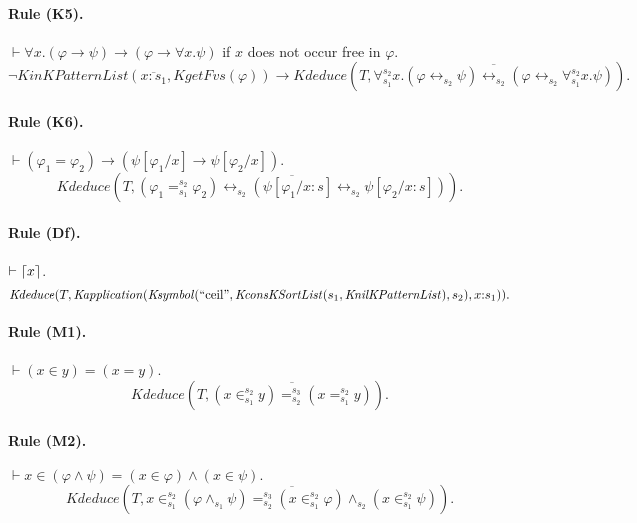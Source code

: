 \documentclass[UTF8,11pt]{article}
\theoremstyle{plain}
\theoremstyle{definition}
\theoremstyle{remark}
\newcommand{\cln}{{:}}
\DeclarePairedDelimiter{\ceil}{\lceil}{\rceil}
\newcommand{\Ksymbol}{\mathit{Ksymbol}}
\newcommand{\KnilKPatternList}{\mathit{KnilKPatternList}}
\newcommand{\KinKPatternList}{\mathit{KinKPatternList}}
\newcommand{\KconsKSortList}{\mathit{KconsKSortList}}
\newcommand{\Kapplication}{\mathit{Kapplication}}
\newcommand{\KgetFvs}{\mathit{KgetFvs}}
\newcommand{\Kdeduce}{\mathit{Kdeduce}}
\newcommand{\quot}[1]{\mathrm{``#1"}}
\begin{document}
\paragraph{Rule (K5).}
$\vdash \forall x . (\varphi \to \psi) \to (\varphi \to \forall x . \psi)$ if $x$ does not occur free in $\varphi$. 
\begin{equation*}
\neg\KinKPatternList(\overline{x \cln s_1}, \KgetFvs(\varphi))
\to \Kdeduce(T, \overline{\forall_{s_1}^{s_2} x . (\varphi \leftrightarrow_{s_2} \psi) \leftrightarrow_{s_2} (\varphi \leftrightarrow_{s_2} \forall_{s_1}^{s_2} x . \psi)}).
\end{equation*}

\paragraph{Rule (K6).}
$\vdash (\varphi_1 = \varphi_2) \to (\psi[\varphi_1/x] \to \psi[\varphi_2/x])$.
\begin{equation*}
\Kdeduce(T, \overline{(\varphi_1 =_{s_1}^{s_2} \varphi_2) \leftrightarrow_{s_2} (\psi[\varphi_1/x \cln s] \leftrightarrow_{s_2} \psi[\varphi_2/x \cln s])}).
\end{equation*}

\paragraph{Rule (Df).}
$\vdash \ceil{x}$.
\begin{equation*}
\Kdeduce(T, \Kapplication(\Ksymbol(\quot{ceil}, \KconsKSortList(s_1, \KnilKPatternList), s_2), x \cln s_1)).
\end{equation*}

\paragraph{Rule (M1).}
$\vdash (x \in y) = (x = y)$.
\begin{equation*}
\Kdeduce(T, \overline{(x \in_{s_1}^{s_2} y) =_{s_2}^{s_3} (x =_{s_1}^{s_2} y)}).
\end{equation*}

\paragraph{Rule (M2).}
$\vdash x \in (\varphi \wedge \psi) = (x \in \varphi) \wedge (x \in \psi).$
\begin{equation*}
\Kdeduce(T, \overline{x \in_{s_1}^{s_2} (\varphi \wedge_{s_1} \psi) =_{s_2}^{s_3} (x \in_{s_1}^{s_2} \varphi) \wedge_{s_2} (x \in_{s_1}^{s_2} \psi)}).
\end{equation*}
\end{document}
